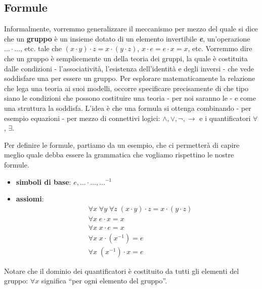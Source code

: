 \subsection{Formule}
Informalmente, vorremmo generalizzare il meccanismo per mezzo del quale si dice che un \textbf{gruppo} è un insieme dotato di un elemento invertibile \textbf{\textit{e}}, un'operazione $\ldots \cdot \ldots$, etc.
tale che $(x \cdot y) \cdot z = x \cdot (y \cdot z)$, $x \cdot e = e \cdot x = x$, etc. Vorremmo dire che un gruppo è semplicemente un  della teoria dei gruppi, la quale è costituita dalle condizioni -
l'associatività, l'esistenza dell'identità e degli inversi - che vede soddisfare una  per essere un gruppo. Per esplorare matematicamente la relazione che lega una teoria ai suoi modelli, occorre specificare 
precisamente di che tipo siano le condizioni che possono costituire una teoria - per noi saranno le  - e come una struttura la soddisfa.
L'idea è che una formula si ottenga combinando  - per esempio equazioni - per mezzo di connettivi logici: $\land,\lor,\neg,\to$ e i quantificatori $\forall$, $\exists$.
\par\medskip
Per definire le formule, partiamo da un esempio, che ci permetterà di capire meglio quale debba essere la grammatica che vogliamo rispettino le nostre formule.
 
\begin{example}
    \emph{}\vspace{-0.7cm}
    \begin{itemize}
        \item \textbf{simboli di base}: $e,\ldots\cdot\ldots,\ldots^{-1}$
        \item \textbf{assiomi}:
        \begin{align*}
            &\forall x\; \forall y\; \forall z \; (x \cdot y) \cdot z = x \cdot (y \cdot z) \\
            &\forall x\; e \cdot x = x \\
            &\forall x\; x \cdot e = x \\
            &\forall x\; x \cdot (x^{-1}) = e \\
            &\forall x\; (x^{-1}) \cdot x = e
        \end{align*}
    \end{itemize}
    Notare che il dominio dei quantificatori è costituito da tutti gli elementi del gruppo: $\forall x$ significa ``per ogni elemento del gruppo''.
\end{example}

